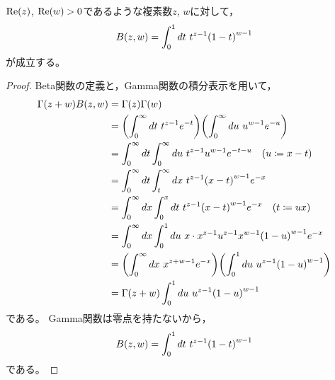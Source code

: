 \documentclass[a4paper,draft]{ltjsarticle}
\begin{document}
\begin{thm}[Beta関数の積分表示]
    $\re{z}$, $\re{w}>0$であるような複素数$z$, $w$に対して，
    \begin{equation}
        \fun{B}{z,w}=\int_0^1 dt\ t^{z-1}\pare{1-t}^{w-1}
    \end{equation}
    が成立する。
    \begin{proof}
        Beta関数の定義と，Gamma関数の積分表示を用いて，
        \begin{align}
            \fun{\Gamma}{z+w}\fun{B}{z,w}
            &=\fun{\Gamma}{z}\fun{\Gamma}{w}
            \\
            &=\pare{\int_0^\infty dt\ t^{z-1}e^{-t}}\pare{\int_0^\infty du\ u^{w-1}e^{-u}}
            \\
            &=\int_0^\infty dt\int_0^\infty du\ t^{z-1}u^{w-1}e^{-t-u}\quad\pare{u\coloneqq x-t}
            \\
            &=\int_0^\infty dt\int_t^\infty dx\ t^{z-1}\pare{x-t}^{w-1}e^{-x}
            \\
            &=\int_0^\infty dx\int_0^x dt\ t^{z-1}\pare{x-t}^{w-1}e^{-x}\quad\pare{t\coloneqq ux}
            \\
            &=\int_0^\infty dx\int_0^1 du\ x\cdot x^{z-1}u^{z-1}x^{w-1}\pare{1-u}^{w-1}e^{-x}
            \\
            &=\pare{\int_0^\infty dx\ x^{z+w-1}e^{-x}}\pare{\int_0^1 du\ u^{z-1}\pare{1-u}^{w-1}}
            \\
            &=\fun{\Gamma}{z+w}\int_0^1 du\ u^{z-1}\pare{1-u}^{w-1}
        \end{align}
        である。
        Gamma関数は零点を持たないから，
        \begin{equation}
            \fun{B}{z,w}=\int_0^1 dt\ t^{z-1}\pare{1-t}^{w-1}
        \end{equation}
        である。
    \end{proof}
\end{thm}
\end{document}
